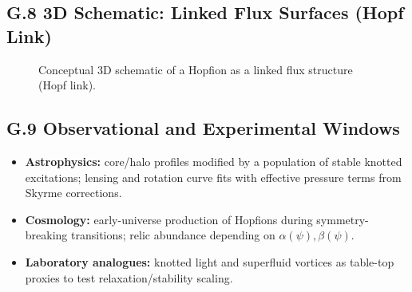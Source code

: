\subsection*{G.8 3D Schematic: Linked Flux Surfaces (Hopf Link)}
\begin{figure}[h!]
\centering
{}
\caption{Conceptual 3D schematic of a Hopfion as a linked flux structure (Hopf link).}
\label{fig:hopf_link}
\end{figure}

\subsection*{G.9 Observational and Experimental Windows}
\begin{itemize}
\item \textbf{Astrophysics:} core/halo profiles modified by a population of stable knotted excitations; lensing and rotation curve fits with effective pressure terms from Skyrme corrections.
\item \textbf{Cosmology:} early-universe production of Hopfions during symmetry-breaking transitions; relic abundance depending on $\alpha(\psi),\beta(\psi)$.
\item \textbf{Laboratory analogues:} knotted light and superfluid vortices as table-top proxies to test relaxation/stability scaling.
\end{itemize}

